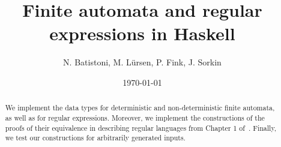 \documentclass[12pt,a4paper]{article}
\title{Finite automata and regular expressions in Haskell}
\author{N. Batistoni, M. L\"ursen, P. Fink, J. Sorkin}
\date{\today}
\begin{document}
\maketitle

\begin{abstract}
    We implement the data types for deterministic and non-deterministic finite automata,
    as well as for regular expressions.
    Moreover, we implement the constructions of the proofs of their equivalence in describing regular languages
    from Chapter 1 of~\cite{sipser2012}.
    Finally, we test our constructions for arbitrarily generated inputs.
\end{abstract}

\vfill

\tableofcontents

\clearpage


% 













% 







\end{document}
